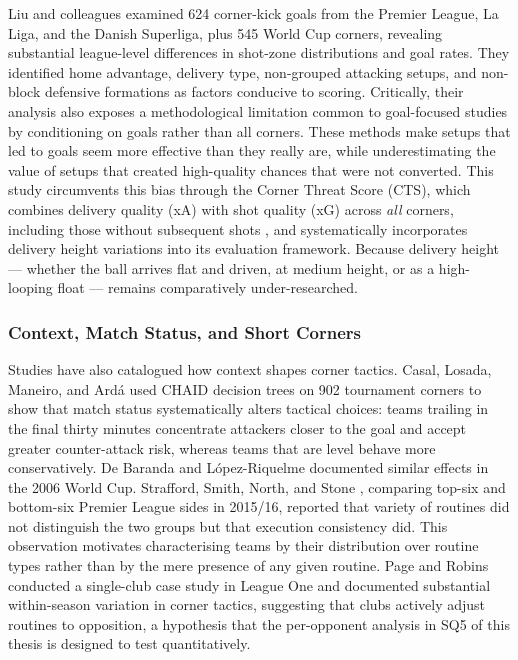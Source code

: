 Liu and colleagues \cite{Liu2025} examined 624 corner-kick goals from the Premier League, La Liga, and the Danish Superliga, 
plus 545 World Cup corners, revealing substantial league-level differences in shot-zone 
distributions and goal rates. They identified home advantage, delivery type, non-grouped 
attacking setups, and non-block defensive formations as factors conducive to scoring. 
Critically, their analysis also exposes a methodological limitation common to goal-focused
 studies by conditioning on goals rather than all corners. These methods make setups that led to 
 goals seem more effective than they really are, while underestimating the value of setups 
 that created high-quality chances that were not converted. This study circumvents this
bias through the Corner Threat Score (CTS), which combines delivery quality (xA) with shot 
quality (xG) across \emph{all} corners, including those without subsequent shots \citep{Lamberts2023}, 
and systematically incorporates delivery height variations into its evaluation framework.
Because delivery height --- whether the ball arrives flat and driven, at medium height, or 
as a high-looping float --- remains comparatively under-researched.

\subsubsection{Context, Match Status, and Short Corners}

Studies have also catalogued how context shapes corner
tactics. Casal, Losada, Maneiro, and Ard\'a \cite{Casal2017} used CHAID
decision trees on 902 tournament corners to show that match status systematically
alters tactical choices: teams trailing in the final thirty minutes concentrate
attackers closer to the goal and accept greater counter-attack risk, whereas
teams that are level behave more conservatively. De Baranda and
L\'opez-Riquelme \cite{DeBaranda2012} documented similar effects in the
2006 World Cup. Strafford, Smith, North, and Stone \cite{Strafford2019},
comparing top-six and bottom-six Premier League sides in 2015/16, reported that
variety of routines did not distinguish the two groups but that execution
consistency did. This observation motivates characterising teams by their
distribution over routine types rather than by the mere presence of any
given routine. Page and Robins \cite{PageRobins2012} conducted a
single-club case study in League One and documented substantial within-season
variation in corner tactics, suggesting that clubs actively adjust routines to
opposition, a hypothesis that the per-opponent analysis in SQ5 of this thesis
is designed to test quantitatively.

